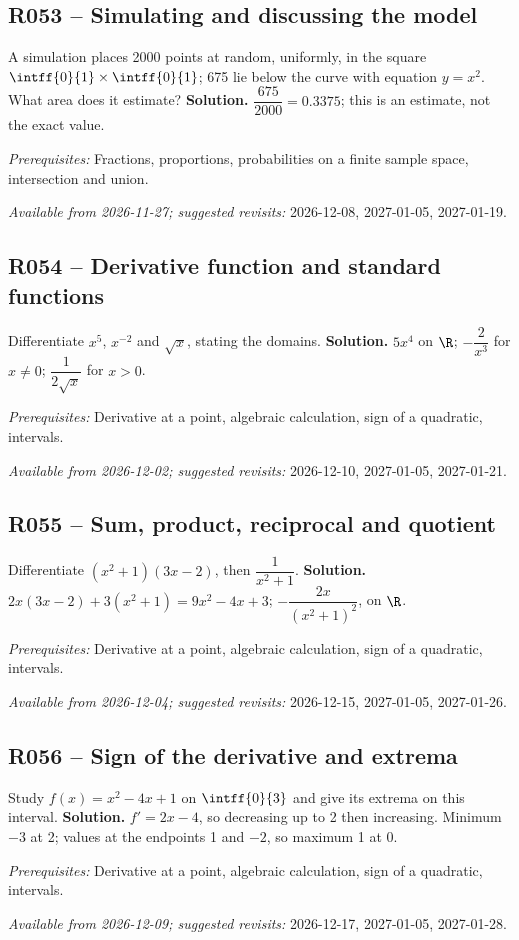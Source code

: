 \subsection*{R053 -- Simulating and discussing the model}\label{R053}
A simulation places 2000 points at random, uniformly, in the square $\intff{0}{1}\times\intff{0}{1}$; 675 lie below the curve with equation $y=x^2$. What area does it estimate?
\ifmxteacher\textbf{Solution.} $\dfrac{675}{2000}=\num{0,3375}$; this is an estimate, not the exact value.\par\textit{Prerequisites:} Fractions, proportions, probabilities on a finite sample space, intersection and union.\par\textit{Available from 2026-11-27; suggested revisits:} 2026-12-08, 2027-01-05, 2027-01-19.\fi
{}\subsection*{R054 -- Derivative function and standard functions}\label{R054}
Differentiate $x^5$, $x^{-2}$ and $\sqrt x$, stating the domains.
\ifmxteacher\textbf{Solution.} $5x^4$ on $\R$; $-\dfrac{2}{x^3}$ for $x\ne0$; $\dfrac{1}{2\sqrt x}$ for $x>0$.\par\textit{Prerequisites:} Derivative at a point, algebraic calculation, sign of a quadratic, intervals.\par\textit{Available from 2026-12-02; suggested revisits:} 2026-12-10, 2027-01-05, 2027-01-21.\fi
{}\subsection*{R055 -- Sum, product, reciprocal and quotient}\label{R055}
Differentiate $(x^2+1)(3x-2)$, then $\dfrac{1}{x^2+1}$.
\ifmxteacher\textbf{Solution.} $2x(3x-2)+3(x^2+1)=9x^2-4x+3$; $-\dfrac{2x}{(x^2+1)^2}$, on $\R$.\par\textit{Prerequisites:} Derivative at a point, algebraic calculation, sign of a quadratic, intervals.\par\textit{Available from 2026-12-04; suggested revisits:} 2026-12-15, 2027-01-05, 2027-01-26.\fi
{}\subsection*{R056 -- Sign of the derivative and extrema}\label{R056}
Study $f(x)=x^2-4x+1$ on $\intff{0}{3}$ and give its extrema on this interval.
\ifmxteacher\textbf{Solution.} $f\prime=2x-4$, so decreasing up to 2 then increasing. Minimum $-3$ at 2; values at the endpoints 1 and $-2$, so maximum 1 at 0.\par\textit{Prerequisites:} Derivative at a point, algebraic calculation, sign of a quadratic, intervals.\par\textit{Available from 2026-12-09; suggested revisits:} 2026-12-17, 2027-01-05, 2027-01-28.\fi
